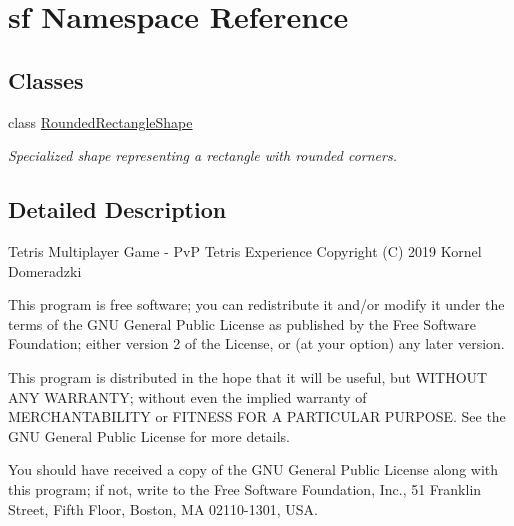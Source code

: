 \hypertarget{namespacesf}{}\section{sf Namespace Reference}
\label{namespacesf}
\subsection*{Classes}
\begin{DoxyCompactItemize}
\item 
class \mbox{\hyperlink{classsf_1_1_rounded_rectangle_shape}{Rounded\+Rectangle\+Shape}}
\begin{DoxyCompactList}\small\item\em Specialized shape representing a rectangle with rounded corners. \end{DoxyCompactList}\end{DoxyCompactItemize}


\subsection{Detailed Description}
Tetris Multiplayer Game -\/ PvP Tetris Experience Copyright (C) 2019 Kornel Domeradzki

This program is free software; you can redistribute it and/or modify it under the terms of the G\+NU General Public License as published by the Free Software Foundation; either version 2 of the License, or (at your option) any later version.

This program is distributed in the hope that it will be useful, but W\+I\+T\+H\+O\+UT A\+NY W\+A\+R\+R\+A\+N\+TY; without even the implied warranty of M\+E\+R\+C\+H\+A\+N\+T\+A\+B\+I\+L\+I\+TY or F\+I\+T\+N\+E\+SS F\+OR A P\+A\+R\+T\+I\+C\+U\+L\+AR P\+U\+R\+P\+O\+SE. See the G\+NU General Public License for more details.

You should have received a copy of the G\+NU General Public License along with this program; if not, write to the Free Software Foundation, Inc., 51 Franklin Street, Fifth Floor, Boston, MA 02110-\/1301, U\+SA. 